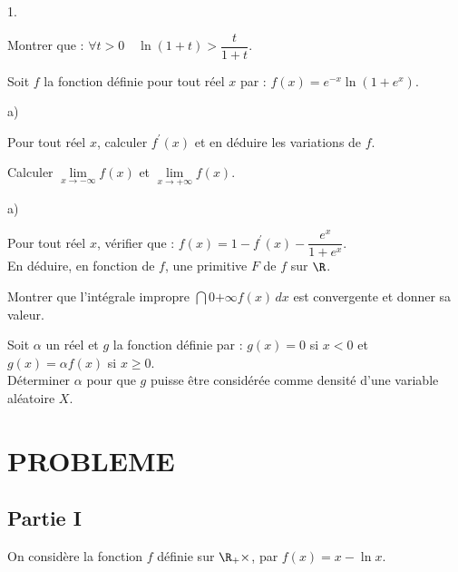 \documentclass[11pt]{article}%
\begin{document}
\begin{noliste}{1.}
 \setlength{\itemsep}{4mm}
\item Montrer que : $\forall t>0\quad \ln (1 + t)>\dfrac{{t}}{{1 +
t}}$.

\item Soit $f$ la fonction définie pour tout réel $x$ par : $f(x) =
e^{-x}\ln
(1 + e^{x})$.

\begin{noliste}{a)}
 \setlength{\itemsep}{2mm}
\item Pour tout réel $x$, calculer $f^{\prime }(x)$ et en déduire les
variations de $f$.

\item Calculer $\underset{{x\rightarrow -\infty }}{{\lim }}f(x)$ et
$\underset{{x\rightarrow + \infty }}{{\lim }}f(x)$.
\end{noliste}

\item 

\begin{noliste}{a)}
 \setlength{\itemsep}{2mm}
\item Pour tout réel $x$, vérifier que : $f(x) = 1-f^{\prime
}(x)-\dfrac{{e^{x}}}{{1 + e^{x}}}$.\\
En déduire, en fonction de $f$, une primitive $F$ de $f$ sur $\R$.

\item Montrer que l'intégrale impropre ${\dint{0}{+ \infty
}{f(x)\,dx}}$ est convergente et donner sa valeur.
\end{noliste}

\item Soit $\alpha $ un réel et $g$ la fonction définie par : $g(x) =
0$ si $x<0$ et $g(x) = \alpha f(x)$ si $x\geq 0$. \\
Déterminer $\alpha $ pour que $g$ puisse être considérée comme densité
d'une
variable aléatoire $X$.
\end{noliste}

\section*{PROBLEME}

\subsection*{Partie I}

On considère la fonction $f$ définie sur $\R_{+}{\times }$, par $f(x) =
x-\ln x$.
\end{document}
